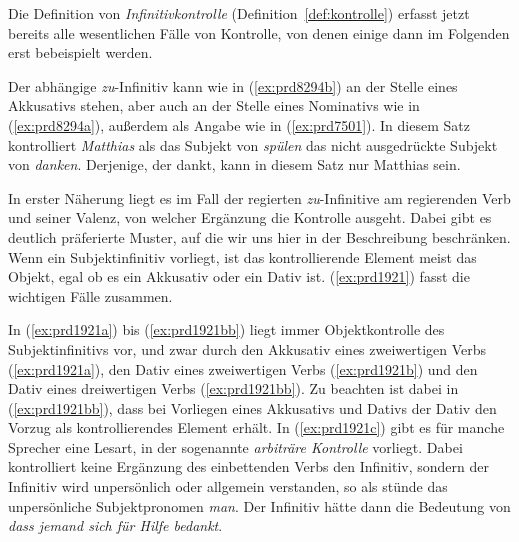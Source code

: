 Die Definition von \textit{Infinitivkontrolle} (Definition~\ref{def:kontrolle}) erfasst jetzt bereits alle wesentlichen Fälle von Kontrolle, von denen einige dann im Folgenden erst bebeispielt werden.


Der abhängige \textit{zu}-Infinitiv kann wie in (\ref{ex:prd8294b}) an der Stelle eines Akkusativs stehen, aber auch an der Stelle eines Nominativs wie in (\ref{ex:prd8294a}), außerdem als Angabe wie in (\ref{ex:prd7501}).
In diesem Satz kontrolliert \textit{Matthias} als das Subjekt von \textit{spülen} das nicht ausgedrückte Subjekt von \textit{danken}.
Derjenige, der dankt, kann in diesem Satz nur Matthias sein.

\begin{exe}
\end{exe}

In erster Näherung liegt es im Fall der regierten \textit{zu}-Infinitive am regierenden Verb und seiner Valenz, von welcher Ergänzung die Kontrolle ausgeht.
Dabei gibt es deutlich präferierte Muster, auf die wir uns hier in der Beschreibung beschränken.
Wenn ein Subjektinfinitiv vorliegt, ist das kontrollierende Element meist das Objekt, egal ob es ein Akkusativ oder ein Dativ ist.
(\ref{ex:prd1921}) fasst die wichtigen Fälle zusammen.

\begin{exe}
  \ex\label{ex:prd1921} 
  \begin{xlist}
  \end{xlist}
\end{exe}

In (\ref{ex:prd1921a}) bis (\ref{ex:prd1921bb}) liegt immer Objektkontrolle des Subjektinfinitivs vor, und zwar durch den Akkusativ eines zweiwertigen Verbs (\ref{ex:prd1921a}), den Dativ eines zweiwertigen Verbs (\ref{ex:prd1921b}) und den Dativ eines dreiwertigen Verbs (\ref{ex:prd1921bb}).
Zu beachten ist dabei in (\ref{ex:prd1921bb}), dass bei Vorliegen eines Akkusativs und Dativs der Dativ den Vorzug als kontrollierendes Element erhält.
In (\ref{ex:prd1921c}) gibt es für manche Sprecher eine Lesart, in der sogenannte \textit{arbiträre Kontrolle} vorliegt.
Dabei kontrolliert keine Ergänzung des einbettenden Verbs den Infinitiv, sondern der Infinitiv wird unpersönlich oder allgemein verstanden, so als stünde das unpersönliche Subjektpronomen \textit{man}.
Der Infinitiv hätte dann die Bedeutung von \textit{dass jemand sich für Hilfe bedankt}.

